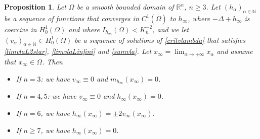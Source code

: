 \documentclass[10pt]{amsart}
\numberwithin{equation}{section}
\newcommand{\Om}{\Omega}
\def \rr {\mathbb{R}}
\def \va{v_{\alpha}}
\def \ha{h_{\alpha}}
\def \hi{h_{\infty}}
\def \nn{\mathbb{N}}
\theoremstyle{plain}
\newtheorem{prop}{Proposition}[section]%
\theoremstyle{remark}
\begin{document}
\begin{prop} \label{prop:blowup:interieur}
Let $\Om$ be a smooth bounded domain of $\rr^n$, $n\geq 3$. Let $(\ha)_{\alpha\in\nn}$ be a sequence of functions that converges in $C^{1}(\overline{\Om})$ to $\hi$, where $-\Delta+\hi$ is coercive in $H^1_0(\Om)$ and where $I_{\hi}(\Om)<K_{n}^{-2}$, and we let $(\va)_{\alpha\in\nn}\in H_0^1(\Om)$ be a sequence of solutions of \eqref{critvlambda} that satisfies \eqref{limvlaL2star}, \eqref{limvlaLinfini} and \eqref{sumvla}. Let $x_\infty = \lim_{\alpha \to + \infty} x_\alpha$ and assume that $x_\infty \in \Om$. Then
\begin{itemize}
\item If $n=3$: we have $v_\infty \equiv 0$ and $m_{h_\infty}(x_\infty) = 0$.
\item If $n=4,5$: we have $v_\infty \equiv 0$ and $h_\infty(x_\infty) = 0$.
\item If $n=6$, we have $h_\infty(x_\infty) = \pm 2 v_\infty(x_\infty)$.
\item If $n \ge 7$, we have $h_\infty(x_\infty) = 0$. 
	\end{itemize}
\end{prop}
\end{document}
